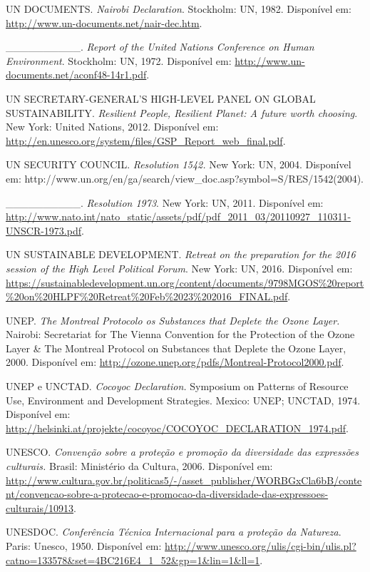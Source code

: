 UN DOCUMENTS. \emph{Nairobi Declaration}. Stockholm: UN, 1982.
Disponível em: \url{http://www.un-documents.net/nair-dec.htm}.

\_\_\_\_\_\_\_\_\_\_. \emph{Report of the United Nations Conference on
Human Environment}. Stockholm: UN, 1972. Disponível em:
\url{http://www.un-documents.net/aconf48-14r1.pdf}.

UN SECRETARY-GENERAL'S HIGH-LEVEL PANEL ON GLOBAL SUSTAINABILITY.
\emph{Resilient People, Resilient Planet: A future worth choosing}. New
York: United Nations, 2012. Disponível em:
\url{http://en.unesco.org/system/files/GSP_Report_web_final.pdf}.

UN SECURITY COUNCIL. \emph{Resolution 1542.} New York: UN, 2004.
Disponível em:
http://www.un.org/en/ga/search/view\_doc.asp?symbol=S/RES/1542(2004).

\_\_\_\_\_\_\_\_\_\_. \emph{Resolution 1973}. New York: UN, 2011.
Disponível em:
\url{http://www.nato.int/nato_static/assets/pdf/pdf_2011_03/20110927_110311-UNSCR-1973.pdf}.

UN SUSTAINABLE DEVELOPMENT. \emph{Retreat on the preparation for the
2016 session of the High Level Political Forum}. New York: UN, 2016.
Disponível em:
\url{https://sustainabledevelopment.un.org/content/documents/9798MGOS\%20report\%20on\%20HLPF\%20Retreat\%20Feb\%2023\%202016_FINAL.pdf}.

UNEP. \emph{The Montreal Protocolo os Substances that Deplete the Ozone
Layer.} Nairobi: Secretariat for The Vienna Convention for the
Protection of the Ozone Layer \& The Montreal Protocol on Substances
that Deplete the Ozone Layer, 2000. Disponível em:
\url{http://ozone.unep.org/pdfs/Montreal-Protocol2000.pdf}.

UNEP e UNCTAD. \emph{Cocoyoc Declaration.} Symposium on Patterns of
Resource Use, Environment and Development Strategies. Mexico: UNEP;
UNCTAD, 1974. Disponível em:
\url{http://helsinki.at/projekte/cocoyoc/COCOYOC_DECLARATION_1974.pdf}.

UNESCO. \emph{Convenção sobre a proteção e promoção da diversidade das
expressões culturais.} Brasil: Ministério da Cultura, 2006. Disponível
em:
\url{http://www.cultura.gov.br/politicas5/-/asset_publisher/WORBGxCla6bB/content/convencao-sobre-a-protecao-e-promocao-da-diversidade-das-expressoes-culturais/10913}.

UNESDOC. \emph{Conferência Técnica Internacional para a proteção da
Natureza}. Paris: Unesco, 1950. Disponível em:
\url{http://www.unesco.org/ulis/cgi-bin/ulis.pl?catno=133578\&set=4BC216E4_1_52\&gp=1\&lin=1\&ll=1}.

